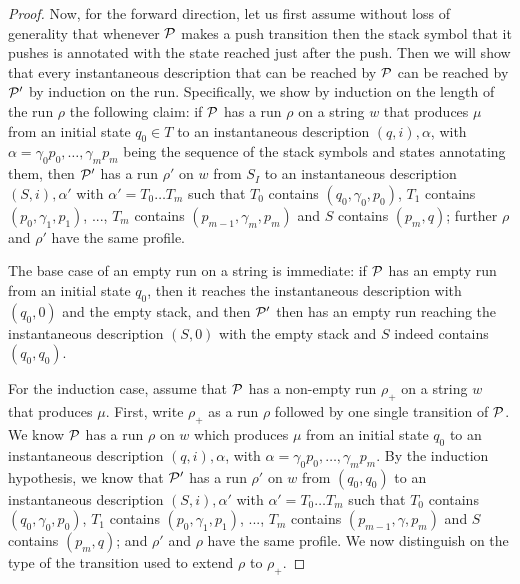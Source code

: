 \begin{proof}
        Now, for the forward
        direction, let us first assume without loss of generality that whenever
        $\mathcal{P}$ makes a push transition then the stack symbol that it pushes is
        annotated with the state reached just after the push. Then we will show
        that every instantaneous description that can be reached by $\mathcal{P}$ can be
        reached by $\mathcal{P}'$ by induction on the run. Specifically, we show by
        induction on the length of the run $\rho$ the following claim: if $\mathcal{P}$
        has a run $\rho$ on a string $w$ that produces $\mu$ from an initial state $q_0 \in T$ to an instantaneous
        description $(q, i), \alpha$, with $\alpha =
        \gamma_0 p_0, \ldots, \gamma_m p_m$ being the sequence of the stack
        symbols and states annotating them, then $\mathcal{P}'$ has a run $\rho'$ on $w$
        from $S_I$ to an instantaneous description $(S, i), \alpha'$ with
        $\alpha' = T_0 \ldots T_m$ such that $T_0$ contains $(q_0, \gamma_0,
        p_0)$, $T_1$ contains $(p_0, \gamma_1, p_1)$, ..., $T_m$ contains
        $(p_{m-1}, \gamma_m, p_m)$ and $S$ contains $(p_m, q)$; further $\rho$
        and $\rho'$ have the same profile.

        The base case of an empty run on a string is immediate: if $\mathcal{P}$ has an
        empty run from an initial state $q_0$, then it reaches the instantaneous
        description with $(q_0, 0)$ and the empty stack, and then $\mathcal{P}'$ then
        has an empty run reaching the instantaneous description $(S, 0)$ with the
        empty stack and $S$ indeed contains $(q_0, q_0)$. 

        For the induction case, assume that $\mathcal{P}$ has a non-empty run $\rho_+$ on a string $w$ that produces $\mu$.
        First, write $\rho_+$ as a run $\rho$ followed by one single transition
        of $\mathcal{P}$. We know $\mathcal{P}$ has a run $\rho$ on $w$ which produces $\mu$ from an initial
        state $q_0$ to an instantaneous description $(q, i), \alpha$,
        with $\alpha = \gamma_0 p_0, \ldots, \gamma_m
        p_m$. By the induction hypothesis, we know that $\mathcal{P}'$ has a run
        $\rho'$ on $w$ from $(q_0, q_0)$ to an instantaneous description $(S,
        i), \alpha'$ with $\alpha' = T_0 \ldots T_m$ such that $T_0$ contains
        $(q_0, \gamma_0, p_0)$, $T_1$ contains $(p_0, \gamma_1, p_1)$, ...,
        $T_m$ contains $(p_{m-1}, \gamma, p_m)$ and $S$ contains $(p_m, q)$; and
        $\rho'$ and $\rho$ have the same profile. We
        now distinguish on the type of the transition used to extend $\rho$ to
        $\rho_+$.


\end{proof}
